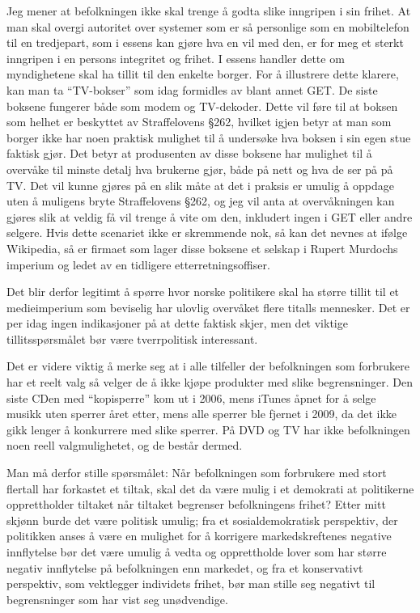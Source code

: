 \documentclass[11pt,norsk,a4paper]{article}
\begin{document}
Jeg mener at befolkningen ikke skal trenge å godta slike inngripen i
sin frihet. At man skal overgi autoritet over systemer som er så
personlige som en mobiltelefon til en tredjepart, som i essens kan
gjøre hva en vil med den, er for meg et sterkt inngripen i en persons
integritet og frihet. I essens handler dette om myndighetene skal ha
tillit til den enkelte borger. For å illustrere dette klarere, kan man
ta ``TV-bokser'' som idag formidles av blant annet GET. De siste
boksene fungerer både som modem og TV-dekoder. Dette vil føre til at
boksen som helhet er beskyttet av Straffelovens §262, hvilket igjen
betyr at man som borger ikke har noen praktisk mulighet til å
undersøke hva boksen i sin egen stue faktisk gjør. Det betyr at
produsenten av disse boksene har mulighet til å overvåke til minste
detalj hva brukerne gjør, både på nett og hva de ser på på TV. Det vil
kunne gjøres på en slik måte at det i praksis er umulig å oppdage uten
å muligens bryte Straffelovens §262, og jeg vil anta at overvåkningen
kan gjøres slik at veldig få vil trenge å vite om den, inkludert ingen
i GET eller andre selgere. Hvis dette scenariet ikke er skremmende
nok, så kan det nevnes at ifølge Wikipedia\cite{ndswiki}, så er firmaet som lager
disse boksene et selskap i Rupert Murdochs imperium og ledet av en
tidligere etterretningsoffiser.

Det blir derfor legitimt å spørre hvor norske politikere skal ha
større tillit til et medieimperium som beviselig har ulovlig overvåket
flere titalls mennesker\cite{newscorpphone}. Det er per idag ingen
indikasjoner på at dette faktisk skjer, men det viktige
tillitsspørsmålet bør være tverrpolitisk interessant. 

Det er videre viktig å merke seg at i alle tilfeller der befolkningen
som forbrukere har et reelt valg så velger de å ikke kjøpe produkter
med slike begrensninger. Den siste CDen med ``kopisperre'' kom ut i
2006\cite{aftkopi}, mens iTunes åpnet for å selge musikk uten sperrer året etter,
mens alle sperrer ble fjernet i 2009\cite{ituneskopi}, da det ikke gikk lenger å
konkurrere med slike sperrer. På DVD og TV har
ikke befolkningen noen reell valgmulighetet, og de består dermed.

Man må derfor stille spørsmålet: Når befolkningen som forbrukere med
stort flertall har forkastet et tiltak, skal det da være mulig i et
demokrati at politikerne opprettholder tiltaket når tiltaket begrenser
befolkningens frihet? Etter mitt skjønn burde det være politisk
umulig; fra et sosialdemokratisk perspektiv, der politikken anses å
være en mulighet for å korrigere markedskreftenes negative innflytelse
bør det være umulig å vedta og opprettholde lover som har større
negativ innflytelse på befolkningen enn markedet, og fra et
konservativt perspektiv, som vektlegger individets frihet, bør man
stille seg negativt til begrensninger som har vist seg unødvendige.
\end{document}

